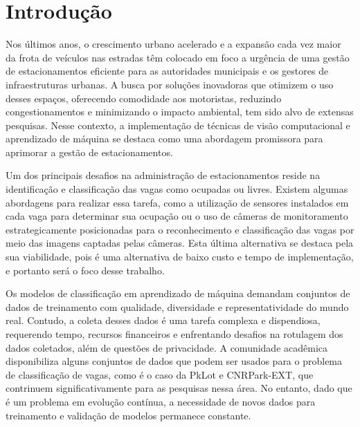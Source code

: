 \chapter{Introdução}



Nos últimos anos, o crescimento urbano acelerado e a expansão cada vez maior da frota de veículos nas estradas têm colocado em foco a urgência de uma gestão de estacionamentos eficiente para as autoridades municipais e os gestores de infraestruturas urbanas. A busca por soluções inovadoras que otimizem o uso desses espaços, oferecendo comodidade aos motoristas, reduzindo congestionamentos e minimizando o impacto ambiental, tem sido alvo de extensas pesquisas. Nesse contexto, a implementação de técnicas de visão computacional e aprendizado de máquina se destaca como uma abordagem promissora para aprimorar a gestão de estacionamentos\cite{systematic-reviews}.

Um dos principais desafios na administração de estacionamentos reside na identificação e classificação das vagas como ocupadas ou livres. Existem algumas abordagens para realizar essa tarefa, como a utilização de sensores instalados em cada vaga para determinar sua ocupação ou o uso de câmeras de monitoramento estrategicamente posicionadas para o reconhecimento e classificação das vagas por meio das imagens captadas pelas câmeras. Esta última alternativa se destaca pela sua viabilidade, pois é uma alternativa de baixo custo e tempo de implementação, e portanto será o foco desse trabalho.

Os modelos de classificação em aprendizado de máquina demandam conjuntos de dados de treinamento com qualidade, diversidade e representatividade do mundo real. Contudo, a coleta desses dados é uma tarefa complexa e dispendiosa, requerendo tempo, recursos financeiros e enfrentando desafios na rotulagem dos dados coletados, além de questões de privacidade. A comunidade acadêmica disponibiliza alguns conjuntos de dados que podem ser usados para o problema de classificação de vagas, como é o caso da PkLot\cite{pklot1} e CNRPark-EXT\cite{cnrpark}, que contrinuem significativamente para as pesquisas nessa área. No entanto, dado que é um problema em evolução contínua, a necessidade de novos dados para treinamento e validação de modelos permanece constante.

